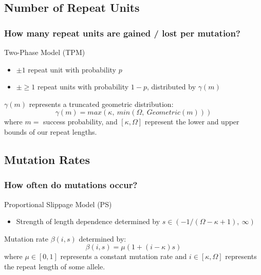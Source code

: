 \documentclass[11pt]{beamer}
\begin{document}
	\subsection{Number of Repeat Units}\label{subsec:numberOfRepeatUnits}
	\begin{frame}
		\frametitle{How many repeat units are gained / lost per mutation?}
		\begin{block}{Two-Phase Model (TPM)}
			\begin{itemize}
				\item $\pm 1$ repeat unit with probability $p$
				\item $\pm \geq 1$ repeat units with probability $1 - p$, distributed by $\gamma(m)$
			\end{itemize}
		\end{block}\bigskip

		$\gamma(m)$ represents a truncated geometric distribution:
		\begin{equation}
			\gamma(m) = \mathit{max}(\kappa, \ \mathit{min}(\Omega, \ \mathit{Geometric}(m)))
		\end{equation}
		where $m = $ success probability, and $[\kappa, \Omega]$ represent the lower and upper bounds of our repeat
		lengths.
	\end{frame}

	\subsection{Mutation Rates}\label{subsec:mutationRates}
	\begin{frame}
		\frametitle{How often do mutations occur?}
		\begin{block}{Proportional Slippage Model (PS)}
			\begin{itemize}
				\item Strength of length dependence determined by $s \in (-1 / (\Omega - \kappa + 1), \ \infty)$
			\end{itemize}
		\end{block}\bigskip

		Mutation rate $\beta(i, s)$ determined by:
		\begin{equation}
			\beta(i, s) = \mu (1 + (i - \kappa)s)
		\end{equation}
		where $\mu \in [0, 1]$ represents a constant mutation rate and $i \in [\kappa, \Omega]$ represents the
		repeat length of some allele.
	\end{frame}
\end{document}
